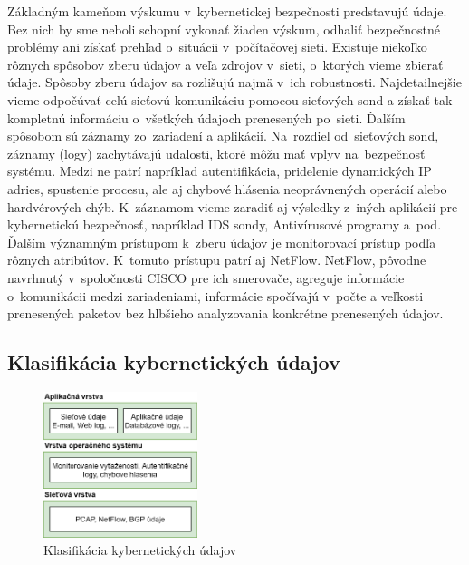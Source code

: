 \documentclass[thesismargins, thesislinespacing, openright, upjsfrontpage]{rnthesis}
\begin{document}
Základným kameňom výskumu v~kybernetickej bezpečnosti predstavujú údaje. Bez nich by sme neboli schopní vykonať žiaden výskum, odhaliť bezpečnostné problémy ani získať prehľad o~situácii v~počítačovej sieti. Existuje niekoľko rôznych spôsobov zberu údajov a veľa zdrojov v~sieti, o~ktorých vieme zbierať údaje. Spôsoby zberu údajov sa rozlišujú najmä v~ich robustnosti. Najdetailnejšie vieme odpočúvať celú sieťovú komunikáciu pomocou sieťových sond a získať tak kompletnú informáciu o~všetkých údajoch prenesených po~sieti. Ďalším spôsobom sú záznamy zo~zariadení a aplikácií. Na~rozdiel od~sieťových sond, záznamy (logy) zachytávajú udalosti, ktoré môžu mať vplyv na~bezpečnosť systému. Medzi ne patrí napríklad autentifikácia, pridelenie dynamických IP adries, spustenie procesu, ale aj chybové hlásenia neoprávnených operácií alebo hardvérových chýb. K~záznamom vieme zaradiť aj výsledky z~iných aplikácií pre kybernetickú bezpečnosť, napríklad IDS sondy, Antivírusové programy a~pod. Ďalším významným prístupom k~zberu údajov je monitorovací prístup podľa rôznych atribútov. K~tomuto prístupu patrí aj NetFlow. NetFlow, pôvodne navrhnutý v~spoločnosti CISCO pre ich smerovače, agreguje informácie o~komunikácii medzi zariadeniami, informácie spočívajú v~počte a veľkosti prenesených paketov bez hlbšieho analyzovania konkrétne prenesených údajov.

\subsection{Klasifikácia kybernetických údajov}

\begin{figure}[h]
  \centering
  \includegraphics[width=0.4\textwidth]{images/cyberdata.png}
  \caption{Klasifikácia kybernetických údajov~\cite{wang2013cyber}}
  \label{fig:cyberdata}
\end{figure}
\end{document}
